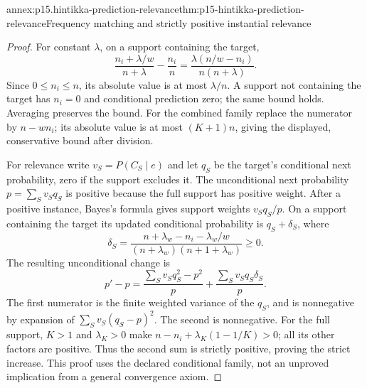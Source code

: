 \begin{annexitem}{annex:p15.hintikka-prediction-relevance}{thm:p15-hintikka-prediction-relevance}{Frequency matching and strictly positive instantial relevance}
\begin{proof}
For constant \(\lambda\), on a support containing the target,
\[
 \frac{n_i+\lambda/w}{n+\lambda}-\frac{n_i}n
 =\frac{\lambda(n/w-n_i)}{n(n+\lambda)}.
\]
Since \(0\leq n_i\leq n\), its absolute value is at most
\(\lambda/n\). A support not containing the target has
\(n_i=0\) and conditional prediction zero; the same bound holds.
Averaging preserves the bound. For the combined family replace the
numerator by \(n-wn_i\); its absolute value is at most
\((K+1)n\), giving the displayed, conservative bound after division.

For relevance write \(v_S=P(C_S\mid e)\) and let \(q_S\)
be the target's conditional next probability, zero if the support
excludes it. The unconditional next probability
\(p=\sum_Sv_Sq_S\) is positive because the full support has positive
weight. After a positive instance, Bayes's formula gives support
weights \(v_Sq_S/p\). On a support containing the target its
updated conditional probability is \(q_S+\delta_S\), where
\[
 \delta_S=\frac{n+\lambda_w-n_i-\lambda_w/w}
                 {(n+\lambda_w)(n+1+\lambda_w)}\geq0.
\]
The resulting unconditional change is
\[
 p'-p=\frac{\sum_Sv_Sq_S^2-p^2}{p}
       +\frac{\sum_Sv_Sq_S\delta_S}{p}.
\]
The first numerator is the finite weighted variance of the \(q_S\),
and is nonnegative by expansion of
\(\sum_Sv_S(q_S-p)^2\). The second is nonnegative. For the full
support, \(K>1\) and \(\lambda_K>0\) make
\(n-n_i+\lambda_K(1-1/K)>0\); all its other factors are positive.
Thus the second sum is strictly positive, proving the strict increase.
This proof uses the declared conditional family, not an unproved
implication from a general convergence axiom.
\end{proof}
\end{annexitem}

